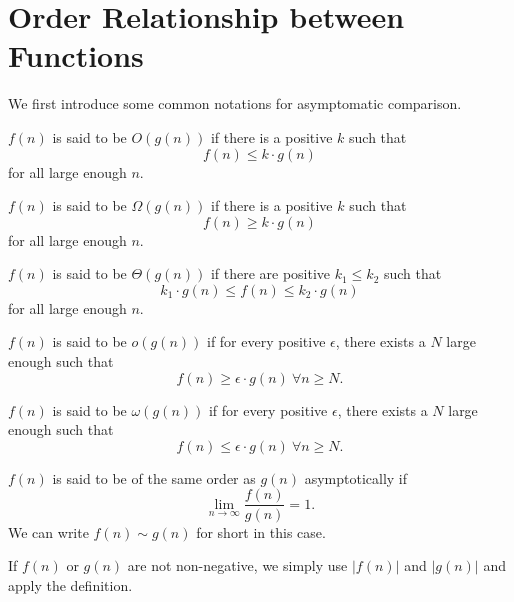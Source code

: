 \section{Order Relationship between Functions}
We first introduce some common notations for asymptomatic comparison.
\begin{definition}
	\(f(n)\) is said to be \(O(g(n))\) if there is a positive \(k\) such that
	\[
		f(n)\leq k\cdot g(n)
	\]
	for all large enough \(n\).
\end{definition}

\begin{definition}
	\(f(n)\) is said to be \(\Omega(g(n))\) if there is a positive \(k\) such that
	\[
		f(n) \geq k\cdot g(n)
	\]
	for all large enough \(n\).
\end{definition}

\begin{definition}
	\(f(n)\) is said to be \(\Theta(g(n))\) if there are positive \(k_1\leq k_2\) such that
	\[
		k_1\cdot g(n)\leq f(n) \leq k_2\cdot g(n)
	\]
	for all large enough \(n\).
\end{definition}

\begin{definition}
	\(f(n)\) is said to be \(o(g(n))\) if for every positive \(\epsilon\), there exists a \(N\) large enough such that
	\[
		f(n) \geq \epsilon\cdot g(n)\ \forall n\geq N.
	\]
\end{definition}

\begin{definition}
	\(f(n)\) is said to be \(\omega(g(n))\) if for every positive \(\epsilon\), there exists a \(N\) large enough such that
	\[
		f(n) \leq \epsilon\cdot g(n)\ \forall n\geq N.
	\]
\end{definition}

\begin{definition}
	\(f(n)\) is said to be of the same order as \(g(n)\) asymptotically if
	\[
		\lim_{n\to \infty } \frac{f(n)}{g(n)} = 1.
	\]
	We can write \(f(n)\sim g(n)\) for short in this case.
\end{definition}

\begin{remark}
	If \(f(n)\) or \(g(n)\) are not non-negative, we simply use \(\left\vert f(n) \right\vert \) and \(\left\vert g(n) \right\vert \)
	and apply the definition.
\end{remark}

